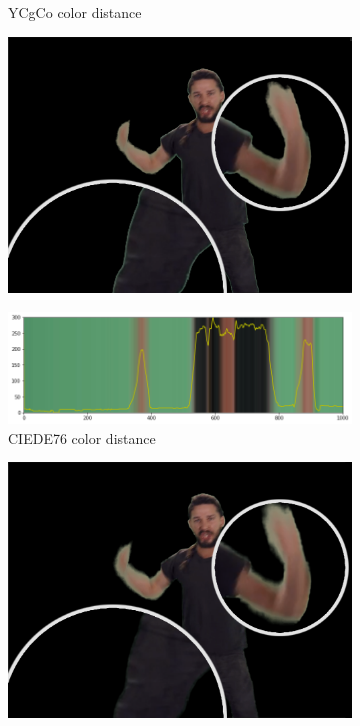 \begin{figure}[htbp]
\begin{subfigure}[t]{.65\textwidth}
		\caption{YCgCo color distance}
	\end{subfigure}
	\begin{subfigure}[t]{.3\textwidth}
		\centering
		\includegraphics[width=\textwidth]{gfx/distances/zoom-ycgco.png}
	\end{subfigure}
	\begin{subfigure}[t]{.65\textwidth}
		\centering
		\includegraphics[width=\textwidth]{gfx/distances/color-ciede76.png}
		\caption{CIEDE76 color distance}
	\end{subfigure}
	\begin{subfigure}[t]{.3\textwidth}
		\centering
		\includegraphics[width=\textwidth]{gfx/distances/zoom-delta_e.png}

\end{subfigure}
\end{figure}
